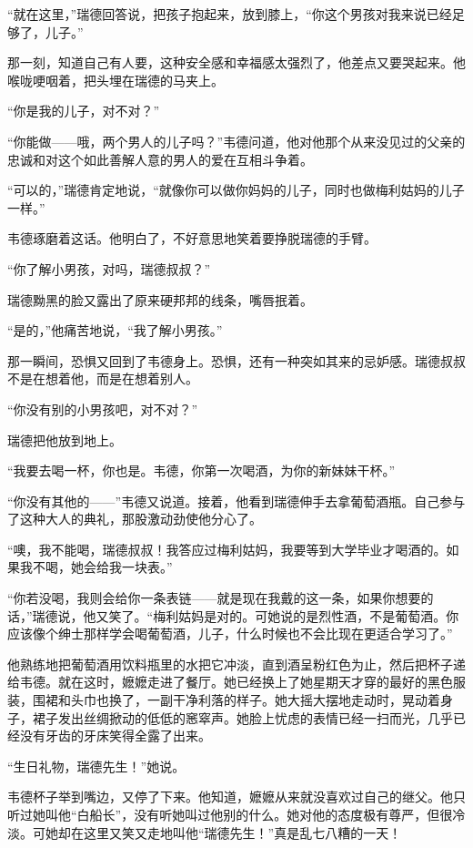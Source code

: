 \par “就在这里，”瑞德回答说，把孩子抱起来，放到膝上，“你这个男孩对我来说已经足够了，儿子。”
\par 那一刻，知道自己有人要，这种安全感和幸福感太强烈了，他差点又要哭起来。他喉咙哽咽着，把头埋在瑞德的马夹上。
\par “你是我的儿子，对不对？”
\par “你能做——哦，两个男人的儿子吗？”韦德问道，他对他那个从来没见过的父亲的忠诚和对这个如此善解人意的男人的爱在互相斗争着。
\par “可以的，”瑞德肯定地说，“就像你可以做你妈妈的儿子，同时也做梅利姑妈的儿子一样。”
\par 韦德琢磨着这话。他明白了，不好意思地笑着要挣脱瑞德的手臂。
\par “你了解小男孩，对吗，瑞德叔叔？”
\par 瑞德黝黑的脸又露出了原来硬邦邦的线条，嘴唇抿着。
\par “是的，”他痛苦地说，“我了解小男孩。”
\par 那一瞬间，恐惧又回到了韦德身上。恐惧，还有一种突如其来的忌妒感。瑞德叔叔不是在想着他，而是在想着别人。
\par “你没有别的小男孩吧，对不对？”
\par 瑞德把他放到地上。
\par “我要去喝一杯，你也是。韦德，你第一次喝酒，为你的新妹妹干杯。”
\par “你没有其他的——”韦德又说道。接着，他看到瑞德伸手去拿葡萄酒瓶。自己参与了这种大人的典礼，那股激动劲使他分心了。
\par “噢，我不能喝，瑞德叔叔！我答应过梅利姑妈，我要等到大学毕业才喝酒的。如果我不喝，她会给我一块表。”
\par “你若没喝，我则会给你一条表链——就是现在我戴的这一条，如果你想要的话，”瑞德说，他又笑了。“梅利姑妈是对的。可她说的是烈性酒，不是葡萄酒。你应该像个绅士那样学会喝葡萄酒，儿子，什么时候也不会比现在更适合学习了。”
\par 他熟练地把葡萄酒用饮料瓶里的水把它冲淡，直到酒呈粉红色为止，然后把杯子递给韦德。就在这时，嬷嬷走进了餐厅。她已经换上了她星期天才穿的最好的黑色服装，围裙和头巾也换了，一副干净利落的样子。她大摇大摆地走动时，晃动着身子，裙子发出丝绸掀动的低低的窸窣声。她脸上忧虑的表情已经一扫而光，几乎已经没有牙齿的牙床笑得全露了出来。
\par “生日礼物，瑞德先生！”她说。
\par 韦德杯子举到嘴边，又停了下来。他知道，嬷嬷从来就没喜欢过自己的继父。他只听过她叫他“白船长”，没有听她叫过他别的什么。她对他的态度极有尊严，但很冷淡。可她却在这里又笑又走地叫他“瑞德先生！”真是乱七八糟的一天！
